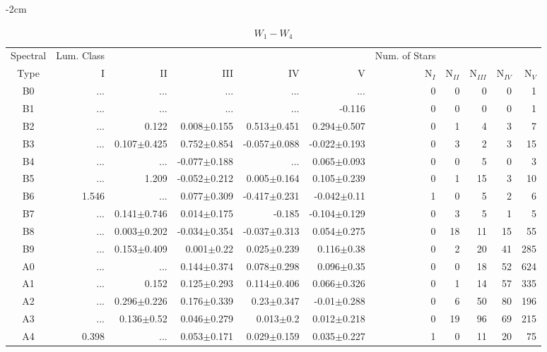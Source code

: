\begin{table}[t]
\tiny
\centering
\caption{$W_{1}-W_{4}$}
\begin{center}
    \addtolength{\leftskip} {-2cm}
    \addtolength{\rightskip}{-2cm}
    \begin{tabular}{c|rrrrr|rrrrr}
    \toprule
    Spectral & Lum. Class & & & & & Num. of Stars & & & &  \\
    Type & I & II & III &  IV & V & N$_{I}$ & N$_{II}$ & N$_{III}$ & N$_{IV}$ & N$_{V}$ \\ \midrule
 
B0	&	 ...	&	 ...	&	 ...	&	 ...	&	 ...	&	0	&	0	&	0	&	0	&	1	\\
B1	&	 ...	&	 ...	&	 ...	&	 ...	&	-0.116	&	0	&	0	&	0	&	0	&	1	\\
B2	&	 ...	&	0.122	&	0.008$\pm$0.155	&	0.513$\pm$0.451	&	0.294$\pm$0.507	&	0	&	1	&	4	&	3	&	7	\\
B3	&	 ...	&	0.107$\pm$0.425	&	0.752$\pm$0.854	&	-0.057$\pm$0.088	&	-0.022$\pm$0.193	&	0	&	3	&	2	&	3	&	15	\\
B4	&	 ...	&	 ...	&	-0.077$\pm$0.188	&	 ...	&	0.065$\pm$0.093	&	0	&	0	&	5	&	0	&	3	\\
B5	&	 ...	&	1.209	&	-0.052$\pm$0.212	&	0.005$\pm$0.164	&	0.105$\pm$0.239	&	0	&	1	&	15	&	3	&	10	\\
B6	&	1.546	&	 ...	&	0.077$\pm$0.309	&	-0.417$\pm$0.231	&	-0.042$\pm$0.11	&	1	&	0	&	5	&	2	&	6	\\
B7	&	 ...	&	0.141$\pm$0.746	&	0.014$\pm$0.175	&	-0.185	&	-0.104$\pm$0.129	&	0	&	3	&	5	&	1	&	5	\\
B8	&	 ...	&	0.003$\pm$0.202	&	-0.034$\pm$0.354	&	-0.037$\pm$0.313	&	0.054$\pm$0.275	&	0	&	18	&	11	&	15	&	55	\\
B9	&	 ...	&	0.153$\pm$0.409	&	0.001$\pm$0.22	&	0.025$\pm$0.239	&	0.116$\pm$0.38	&	0	&	2	&	20	&	41	&	285	\\
A0	&	 ...	&	 ...	&	0.144$\pm$0.374	&	0.078$\pm$0.298	&	0.096$\pm$0.35	&	0	&	0	&	18	&	52	&	624	\\
A1	&	 ...	&	0.152	&	0.125$\pm$0.293	&	0.114$\pm$0.406	&	0.066$\pm$0.326	&	0	&	1	&	14	&	57	&	335	\\
A2	&	 ...	&	0.296$\pm$0.226	&	0.176$\pm$0.339	&	0.23$\pm$0.347	&	-0.01$\pm$0.288	&	0	&	6	&	50	&	80	&	196	\\
A3	&	 ...	&	0.136$\pm$0.52	&	0.046$\pm$0.279	&	0.013$\pm$0.2	&	0.012$\pm$0.218	&	0	&	19	&	96	&	69	&	215	\\
A4	&	0.398	&	 ...	&	0.053$\pm$0.171	&	0.029$\pm$0.159	&	0.035$\pm$0.227	&	1	&	0	&	11	&	20	&	75	\\

\end{tabular}
\end{center}
\end{table}
